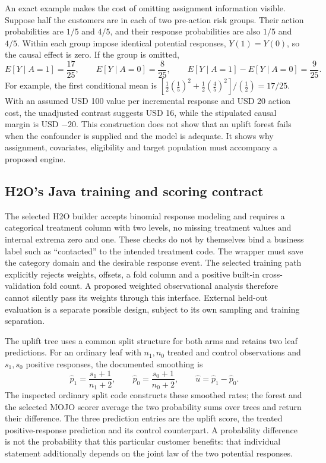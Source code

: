 An exact example makes the cost of omitting assignment information visible.
Suppose half the customers are in each of two pre-action risk groups. Their
action probabilities are $1/5$ and $4/5$, and their response probabilities are
also $1/5$ and $4/5$. Within each group impose identical potential responses,
$Y(1)=Y(0)$, so the causal effect is zero. If the group is omitted,
\begin{equation}
 E[Y\mid A=1]=\frac{17}{25},\qquad
 E[Y\mid A=0]=\frac{8}{25},\qquad
 E[Y\mid A=1]-E[Y\mid A=0]=\frac9{25}.
 \label{exec20:javafx-confounding}
\end{equation}
For example, the first conditional mean is
$[\tfrac12(\tfrac15)^2+\tfrac12(\tfrac45)^2]/(\tfrac12)=17/25$.
With an assumed USD 100 value per incremental response and USD 20 action cost,
the unadjusted contrast suggests USD 16, while the stipulated causal margin is
USD $-20$. This construction does not show that an uplift forest fails when
the confounder is supplied and the model is adequate. It shows why assignment,
covariates, eligibility and target population must accompany a proposed engine.
\citep{exec20_javaeffects_reference}

\subsection{H2O's Java training and scoring contract}
\label{exec20:javafx-uplift}

The selected H2O builder accepts binomial response modeling and requires a
categorical treatment column with two levels, no missing treatment values and
internal extrema zero and one. These checks do not by themselves bind a
business label such as ``contacted'' to the intended treatment code. The
wrapper must save the category domain and the desirable response event.
The selected training path explicitly rejects weights, offsets, a fold column
and a positive built-in cross-validation fold count. A proposed weighted
observational analysis therefore cannot silently pass its weights through this
interface. External held-out evaluation is a separate possible design, subject
to its own sampling and training separation.
\citep{exec20_javaeffects_h2o}

The uplift tree uses a common split structure for both arms and retains two
leaf predictions. For an ordinary leaf with $n_1,n_0$ treated and control
observations and $s_1,s_0$ positive responses, the documented smoothing is
\begin{equation}
 \widehat p_1=\frac{s_1+1}{n_1+2},\qquad
 \widehat p_0=\frac{s_0+1}{n_0+2},\qquad
 \widehat u=\widehat p_1-\widehat p_0.
 \label{exec20:javafx-smoothing}
\end{equation}
The inspected ordinary split code constructs these smoothed rates; the forest
and the selected MOJO scorer average the two probability sums over trees and
return their difference. The three prediction entries are the uplift score,
the treated positive-response prediction and its control counterpart. A
probability difference is not the probability that this particular customer
benefits: that individual statement additionally depends on the joint law of
the two potential responses.
\citep{exec20_javaeffects_h2o}

